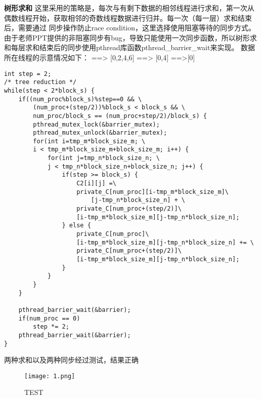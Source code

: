 \documentclass{article}
\begin{document}
\textbf{树形求和}
\newline
这里采用的策略是，每次与有剩下数据的相邻线程进行求和，第一次从偶数线程开始，获取相邻的奇数线程数据进行归并。每一次（每一层）求和结束后，需要通过
同步操作防止race condition，这里选择使用阻塞等待的同步方式。
由于老师PPT提供的非阻塞同步有bug，导致只能使用一次同步函数，所以树形求和每层求和结束后的同步使用pthread库函数pthread\_barrier\_wait来实现。
\newline
数据所在线程的示意情况如下：
\newline
[0,1,2,3,4,5,6,7,8] ==> [0,2,4,6] ==> [0,4] ==>[0]
\begin{lstlisting}
int step = 2;
/* tree reduction */
while(step < 2*block_s) {
    if((num_proc%block_s)%step==0 && \
        (num_proc+(step/2))%block_s < block_s && \
        num_proc/block_s == (num_proc+step/2)/block_s) {
        pthread_mutex_lock(&barrier_mutex);
        pthread_mutex_unlock(&barrier_mutex);
        for(int i=tmp_m*block_size_m; \
        i < tmp_m*block_size_m+block_size_m; i++) {
            for(int j=tmp_n*block_size_n; \
            j < tmp_n*block_size_n+block_size_n; j++) {
                if(step >= block_s) {                       
                    C2[i][j] =\
                    private_C[num_proc][i-tmp_m*block_size_m]\
                        [j-tmp_n*block_size_n] + \
                    private_C[num_proc+(step/2)]\
                    [i-tmp_m*block_size_m][j-tmp_n*block_size_n];
                } else {
                    private_C[num_proc]\
                    [i-tmp_m*block_size_m][j-tmp_n*block_size_n] += \
                    private_C[num_proc+(step/2)]\
                    [i-tmp_m*block_size_m][j-tmp_n*block_size_n];
                }
            }
        }
    }
    
    pthread_barrier_wait(&barrier);
    if(num_proc == 0)
        step *= 2;
    pthread_barrier_wait(&barrier);
}
\end{lstlisting}

两种求和以及两种同步经过测试，结果正确
\begin{figure}[htpb]
    \centering
    \texttt{[image: 1.png]}    
    \caption{TEST}
\end{figure}
\end{document}
